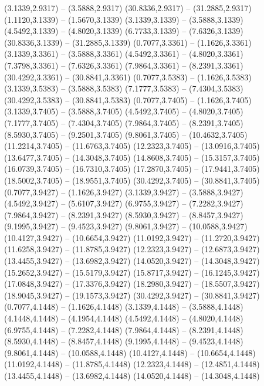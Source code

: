 {\begin{scope}[shift={(#1,#2)}]
    (3.1339,2.9317) -- (3.5888,2.9317)
    (30.8336,2.9317) -- (31.2885,2.9317)
    (1.1120,3.1339) -- (1.5670,3.1339)
    (3.1339,3.1339) -- (3.5888,3.1339)
    (4.5492,3.1339) -- (4.8020,3.1339)
    (6.7733,3.1339) -- (7.6326,3.1339)
    (30.8336,3.1339) -- (31.2885,3.1339)
    (0.7077,3.3361) -- (1.1626,3.3361)
    (3.1339,3.3361) -- (3.5888,3.3361)
    (4.5492,3.3361) -- (4.8020,3.3361)
    (7.3798,3.3361) -- (7.6326,3.3361)
    (7.9864,3.3361) -- (8.2391,3.3361)
    (30.4292,3.3361) -- (30.8841,3.3361)
    (0.7077,3.5383) -- (1.1626,3.5383)
    (3.1339,3.5383) -- (3.5888,3.5383)
    (7.1777,3.5383) -- (7.4304,3.5383)
    (30.4292,3.5383) -- (30.8841,3.5383)
    (0.7077,3.7405) -- (1.1626,3.7405)
    (3.1339,3.7405) -- (3.5888,3.7405)
    (4.5492,3.7405) -- (4.8020,3.7405)
    (7.1777,3.7405) -- (7.4304,3.7405)
    (7.9864,3.7405) -- (8.2391,3.7405)
    (8.5930,3.7405) -- (9.2501,3.7405)
    (9.8061,3.7405) -- (10.4632,3.7405)
    (11.2214,3.7405) -- (11.6763,3.7405)
    (12.2323,3.7405) -- (13.0916,3.7405)
    (13.6477,3.7405) -- (14.3048,3.7405)
    (14.8608,3.7405) -- (15.3157,3.7405)
    (16.0739,3.7405) -- (16.7310,3.7405)
    (17.2870,3.7405) -- (17.9441,3.7405)
    (18.5002,3.7405) -- (18.9551,3.7405)
    (30.4292,3.7405) -- (30.8841,3.7405)
    (0.7077,3.9427) -- (1.1626,3.9427)
    (3.1339,3.9427) -- (3.5888,3.9427)
    (4.5492,3.9427) -- (5.6107,3.9427)
    (6.9755,3.9427) -- (7.2282,3.9427)
    (7.9864,3.9427) -- (8.2391,3.9427)
    (8.5930,3.9427) -- (8.8457,3.9427)
    (9.1995,3.9427) -- (9.4523,3.9427)
    (9.8061,3.9427) -- (10.0588,3.9427)
    (10.4127,3.9427) -- (10.6654,3.9427)
    (11.0192,3.9427) -- (11.2720,3.9427)
    (11.6258,3.9427) -- (11.8785,3.9427)
    (12.2323,3.9427) -- (12.6873,3.9427)
    (13.4455,3.9427) -- (13.6982,3.9427)
    (14.0520,3.9427) -- (14.3048,3.9427)
    (15.2652,3.9427) -- (15.5179,3.9427)
    (15.8717,3.9427) -- (16.1245,3.9427)
    (17.0848,3.9427) -- (17.3376,3.9427)
    (18.2980,3.9427) -- (18.5507,3.9427)
    (18.9045,3.9427) -- (19.1573,3.9427)
    (30.4292,3.9427) -- (30.8841,3.9427)
    (0.7077,4.1448) -- (1.1626,4.1448)
    (3.1339,4.1448) -- (3.5888,4.1448)
    (4.1448,4.1448) -- (4.1954,4.1448)
    (4.5492,4.1448) -- (4.8020,4.1448)
    (6.9755,4.1448) -- (7.2282,4.1448)
    (7.9864,4.1448) -- (8.2391,4.1448)
    (8.5930,4.1448) -- (8.8457,4.1448)
    (9.1995,4.1448) -- (9.4523,4.1448)
    (9.8061,4.1448) -- (10.0588,4.1448)
    (10.4127,4.1448) -- (10.6654,4.1448)
    (11.0192,4.1448) -- (11.8785,4.1448)
    (12.2323,4.1448) -- (12.4851,4.1448)
    (13.4455,4.1448) -- (13.6982,4.1448)
    (14.0520,4.1448) -- (14.3048,4.1448)

\end{scope}}
